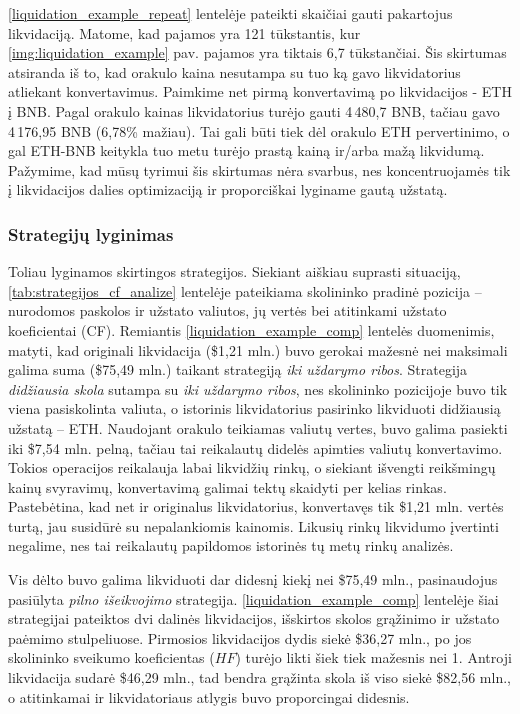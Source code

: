 \documentclass[]{VUMIFTemplateClass}
\begin{document}
\ref{liquidation_example_repeat} lentelėje pateikti skaičiai gauti pakartojus likvidaciją. Matome, kad pajamos yra 121 tūkstantis, kur \ref{img:liquidation_example} pav. pajamos yra tiktais 6,7 tūkstančiai. Šis skirtumas atsiranda iš to, kad orakulo kaina nesutampa su tuo ką gavo likvidatorius atliekant konvertavimus. Paimkime net pirmą konvertavimą po likvidacijos - ETH į BNB. Pagal orakulo kainas likvidatorius turėjo gauti 4\,480,7 BNB, tačiau gavo 4\,176,95 BNB (6,78\% mažiau). Tai gali būti tiek dėl orakulo ETH pervertinimo, o gal ETH-BNB keitykla tuo metu turėjo prastą kainą ir/arba mažą likvidumą. Pažymime, kad mūsų tyrimui šis skirtumas nėra svarbus, nes koncentruojamės tik į likvidacijos dalies optimizaciją ir proporciškai lyginame gautą užstatą.

\subsubsection{Strategijų lyginimas}
Toliau lyginamos skirtingos strategijos. Siekiant aiškiau suprasti situaciją, \ref{tab:strategijos_cf_analize} lentelėje pateikiama skolininko pradinė pozicija – nurodomos paskolos ir užstato valiutos, jų vertės bei atitinkami užstato koeficientai (CF). Remiantis \ref{liquidation_example_comp} lentelės duomenimis, matyti, kad originali likvidacija (\$1,21 mln.) buvo gerokai mažesnė nei maksimali galima suma (\$75,49 mln.) taikant strategiją \textit{iki uždarymo ribos}. Strategija \textit{didžiausia skola} sutampa su \textit{iki uždarymo ribos}, nes skolininko pozicijoje buvo tik viena pasiskolinta valiuta, o istorinis likvidatorius pasirinko likviduoti didžiausią užstatą – ETH. Naudojant orakulo teikiamas valiutų vertes, buvo galima pasiekti iki \$7{,}54 mln. pelną, tačiau tai reikalautų didelės apimties valiutų konvertavimo. Tokios operacijos reikalauja labai likvidžių rinkų, o siekiant išvengti reikšmingų kainų svyravimų, konvertavimą galimai tektų skaidyti per kelias rinkas. Pastebėtina, kad net ir originalus likvidatorius, konvertavęs tik \$1{,}21 mln. vertės turtą, jau susidūrė su nepalankiomis kainomis. Likusių rinkų likvidumo įvertinti negalime, nes tai reikalautų papildomos istorinės tų metų rinkų analizės.

Vis dėlto buvo galima likviduoti dar didesnį kiekį nei \$75,49 mln., pasinaudojus pasiūlyta \textit{pilno išeikvojimo} strategija. \ref{liquidation_example_comp} lentelėje šiai strategijai pateiktos dvi dalinės likvidacijos, išskirtos skolos grąžinimo ir užstato paėmimo stulpeliuose. Pirmosios likvidacijos dydis siekė \$36,27 mln., po jos skolininko sveikumo koeficientas ($HF$) turėjo likti šiek tiek mažesnis nei 1. Antroji likvidacija sudarė \$46,29 mln., tad bendra grąžinta skola iš viso siekė \$82,56 mln., o atitinkamai ir likvidatoriaus atlygis buvo proporcingai didesnis.
\end{document}
